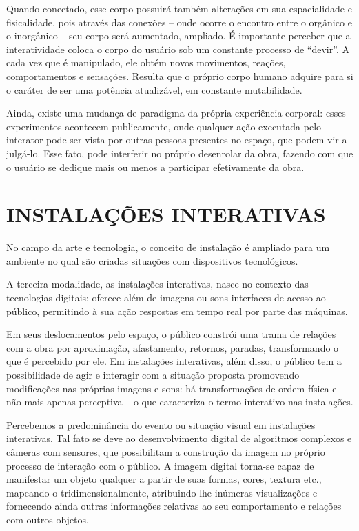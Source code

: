 Quando conectado, esse corpo possuirá também alterações em sua espacialidade e fisicalidade, pois através das conexões – onde ocorre o encontro entre o orgânico e o inorgânico – seu corpo será aumentado, ampliado. É importante perceber que a interatividade coloca o corpo do usuário sob um constante processo de “devir”. A cada vez que é manipulado, ele obtém novos movimentos, reações, comportamentos e sensações. Resulta que o próprio corpo humano adquire para si o caráter de ser uma potência atualizável, em constante mutabilidade.\cite{vares}


Ainda, existe uma mudança de paradigma da própria experiência corporal: esses experimentos acontecem publicamente, onde qualquer ação executada pelo interator pode ser vista por outras pessoas presentes no espaço, que podem vir a julgá-lo. Esse fato, pode interferir no próprio desenrolar da obra, fazendo com que o usuário se dedique mais ou menos a participar efetivamente da obra.\cite{vares}


\section{INSTALAÇÕES INTERATIVAS}

No campo da arte e tecnologia, o conceito de instalação é ampliado para um ambiente no qual são criadas situações com dispositivos tecnológicos. \cite[p. 5]{bochio}

A terceira modalidade, as instalações interativas, nasce no contexto das tecnologias digitais; oferece além de imagens ou sons interfaces de acesso ao público, permitindo à sua ação respostas em tempo real por parte das máquinas. \cite[p. 6]{bochio}

Em seus deslocamentos pelo espaço, o público constrói uma trama de relações com a obra por aproximação, afastamento, retornos, paradas, transformando o que é percebido por ele. Em instalações interativas, além disso, o público tem a possibilidade de agir e interagir com a situação proposta promovendo modificações nas próprias imagens e sons:  há transformações de ordem física e não mais apenas perceptiva – o que caracteriza o termo interativo nas instalações.  \cite[p. 6]{bochio}

Percebemos a predominância do evento ou situação visual em instalações interativas. Tal fato se deve ao desenvolvimento digital de algoritmos complexos e câmeras com sensores, que possibilitam a construção da imagem no próprio processo de interação com o público. A imagem digital torna-se capaz de manifestar um objeto qualquer a partir de suas formas, cores, textura etc., mapeando-o tridimensionalmente, atribuindo-lhe inúmeras visualizações e fornecendo ainda outras informações relativas ao seu comportamento e relações com outros objetos. \cite[p. 6]{bochio}

